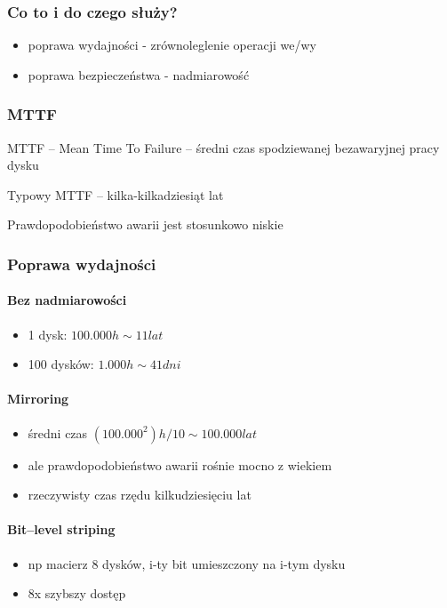 \documentclass[12pt]{article}
\begin{document}
\subsubsection{Co to i do czego służy?}
\begin{itemize}
\item poprawa wydajności - zrównoleglenie operacji we/wy
\item poprawa bezpieczeństwa - nadmiarowość
\end{itemize}

\subsubsection{MTTF}
MTTF -- Mean Time To Failure -- średni czas spodziewanej bezawaryjnej pracy dysku

Typowy MTTF -- kilka-kilkadziesiąt lat

Prawdopodobieństwo awarii jest stosunkowo niskie

\subsubsection{Poprawa wydajności}
\paragraph{Bez nadmiarowości}
\begin{itemize}
\item 1 dysk: $ 100.000h \sim 11 lat $
\item 100 dysków: $ 1.000h \sim 41dni $
\end{itemize}
\paragraph{Mirroring}
\begin{itemize}
\item średni czas $ (100.000 ^ 2)h / 10 \sim 100.000 lat $
\item ale prawdopodobieństwo awarii rośnie mocno z wiekiem
\item rzeczywisty czas rzędu kilkudziesięciu lat
\end{itemize}
\paragraph{Bit--level striping}
\begin{itemize}
\item np macierz 8 dysków, i-ty bit umieszczony na i-tym dysku
\item 8x szybszy dostęp
\end{itemize}
\end{document}
